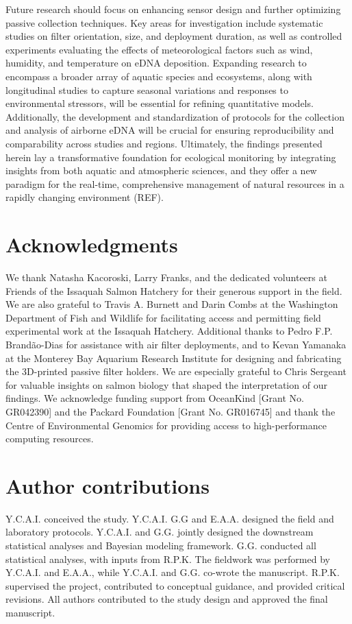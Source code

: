 \documentclass{article}
\begin{document}
Future research should focus on enhancing sensor design and further optimizing passive collection techniques. Key areas for investigation include systematic studies on filter orientation, size, and deployment duration, as well as controlled experiments evaluating the effects of meteorological factors such as wind, humidity, and temperature on eDNA deposition. Expanding research to encompass a broader array of aquatic species and ecosystems, along with longitudinal studies to capture seasonal variations and responses to environmental stressors, will be essential for refining quantitative models. Additionally, the development and standardization of protocols for the collection and analysis of airborne eDNA will be crucial for ensuring reproducibility and comparability across studies and regions. Ultimately, the findings presented herein lay a transformative foundation for ecological monitoring by integrating insights from both aquatic and atmospheric sciences, and they offer a new paradigm for the real-time, comprehensive management of natural resources in a rapidly changing environment (REF).

\section*{Acknowledgments}
We thank Natasha Kacoroski, Larry Franks, and the dedicated volunteers at Friends of the Issaquah Salmon Hatchery for their generous support in the field. We are also grateful to Travis A. Burnett and Darin Combs at the Washington Department of Fish and Wildlife for facilitating access and permitting field experimental work at the Issaquah Hatchery. Additional thanks to Pedro F.P. Brandão-Dias for assistance with air filter deployments, and to Kevan Yamanaka at the Monterey Bay Aquarium Research Institute for designing and fabricating the 3D-printed passive filter holders. We are especially grateful to Chris Sergeant for valuable insights on salmon biology that shaped the interpretation of our findings. We acknowledge funding support from OceanKind [Grant No. GR042390] and the Packard Foundation [Grant No. GR016745] and thank the Centre of Environmental Genomics for providing access to high-performance computing resources.

\section*{Author contributions}
Y.C.A.I. conceived the study. Y.C.A.I. G.G and E.A.A. designed the field and laboratory protocols. Y.C.A.I. and G.G. jointly designed the downstream statistical analyses and Bayesian modeling framework. G.G. conducted all statistical analyses, with inputs from R.P.K. The fieldwork was performed by Y.C.A.I. and E.A.A., while Y.C.A.I. and G.G. co-wrote the manuscript. R.P.K. supervised the project, contributed to conceptual guidance, and provided critical revisions. All authors contributed to the study design and approved the final manuscript.  
\end{document}
